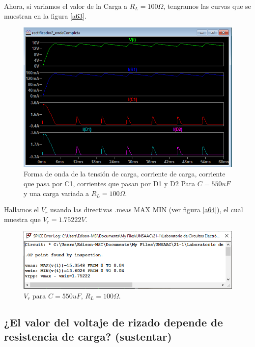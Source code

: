 \documentclass[a4paper]{IEEEtran} %
\begin{document}
Ahora, si variamos el valor de la Carga a $R_L = 100 \Omega$, tengramos las curvas que se muestran en la figura \eqref{a63}.

\begin{figure}[!h]
	\centering
	\includegraphics[scale=0.5]{IMAGENES/a63}
	\caption{Forma de onda de la tensión de carga, corriente de carga, corriente que pasa por C1, corrientes que pasan por D1 y D2 Para $C = 550uF$ y una carga variada a $R_L = 100 \Omega$.}
	\label{a63}
\end{figure}

Hallamos el $V_r$ usando las directivas .meas MAX MIN (ver figura \eqref{a64}), el cual muestra que  $V_r = 1.75222V$.

\begin{figure}[!h]
	\centering
	\includegraphics[scale=0.5]{IMAGENES/a64}
	\caption{$V_r$ para $C = 550uF$, $R_L = 100\Omega$.}
	\label{a64}
\end{figure}


\subsection{¿El valor del voltaje de rizado depende de resistencia de carga? (sustentar)}
\end{document}
